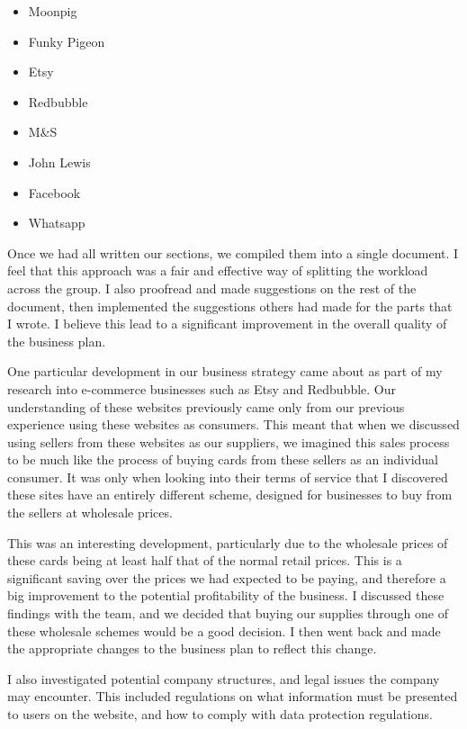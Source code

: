 \documentclass[10pt,a4paper]{article}
\begin{document}
\begin{appendices}
\begin{itemize}
	\item Moonpig
	\item Funky Pigeon
	\item Etsy
	\item Redbubble
	\item M\&S
	\item John Lewis
	\item Facebook
	\item Whatsapp
\end{itemize}

Once we had all written our sections, we compiled them into a single document. I feel that this approach was a fair and effective way of splitting the workload across the group. I also proofread and made suggestions on the rest of the document, then implemented the suggestions others had made for the parts that I wrote. I believe this lead to a significant improvement in the overall quality of the business plan.

One particular development in our business strategy came about as part of my research into e-commerce businesses such as Etsy and Redbubble. Our understanding of these websites previously came only from our previous experience using these websites as consumers. This meant that when we discussed using sellers from these websites as our suppliers, we imagined this sales process to be much like the process of buying cards from these sellers as an individual consumer. It was only when looking into their terms of service that I discovered these sites have an entirely different scheme, designed for businesses to buy from the sellers at wholesale prices.

This was an interesting development, particularly due to the wholesale prices of these cards being at least half that of the normal retail prices. This is a significant saving over the prices we had expected to be paying, and therefore a big improvement to the potential profitability of the business. I discussed these findings with the team, and we decided that buying our supplies through one of these wholesale schemes would be a good decision. I then went back and made the appropriate changes to the business plan to reflect this change.

I also investigated potential company structures, and legal issues the company may encounter. This included regulations on what information must be presented to users on the website, and how to comply with data protection regulations.


\end{appendices}
\end{document}
